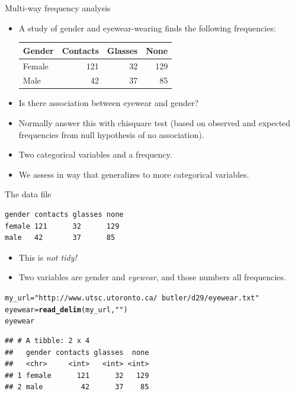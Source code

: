 \documentclass[unknownkeysallowed]{beamer}\usepackage[]{graphicx}\usepackage[]{color}
\makeatletter
\newcommand{\hlstr}[1]{\textcolor[rgb]{0.192,0.494,0.8}{#1}}%
\newcommand{\hlstd}[1]{\textcolor[rgb]{0.345,0.345,0.345}{#1}}%
\newcommand{\hlkwb}[1]{\textcolor[rgb]{0.69,0.353,0.396}{#1}}%
\newcommand{\hlkwd}[1]{\textcolor[rgb]{0.737,0.353,0.396}{\textbf{#1}}}%
\newenvironment{kframe}{%
 \def\at@end@of@kframe{}%
 \ifinner\ifhmode%
  \def\at@end@of@kframe{\end{minipage}}%
  \begin{minipage}{\columnwidth}%
 \fi\fi%
 \def\FrameCommand##1{\hskip\@totalleftmargin \hskip-\fboxsep
 \colorbox{shadecolor}{##1}\hskip-\fboxsep
     \hskip-\linewidth \hskip-\@totalleftmargin \hskip\columnwidth}%
 \MakeFramed {\advance\hsize-\width
   \@totalleftmargin\z@ \linewidth\hsize
   \@setminipage}}%
 {\par\unskip\endMakeFramed%
 \at@end@of@kframe}
\newenvironment{knitrout}{}{} %
\makeatother
\begin{document}
\begin{frame}[fragile]{Multi-way frequency analysis}

  \begin{itemize}
  \item A study of gender and eyewear-wearing finds the following frequencies:

    \begin{tabular}{lrrr}
      \hline
      Gender & Contacts & Glasses & None \\
      \hline
      Female & 121 & 32 & 129 \\
      Male & 42 & 37 & 85\\
      \hline
    \end{tabular}


  \item Is there association between eyewear and gender?
  \item Normally answer this with chisquare test (based on observed and expected frequencies from null hypothesis of no association).
  \item Two categorical variables and a frequency.
  \item We assess in way that generalizes to more categorical variables.

  \end{itemize}

\end{frame}

\begin{frame}[fragile]{The data file}
  
\begin{verbatim}
gender contacts glasses none
female 121      32      129
male   42       37      85
\end{verbatim}
  
  \begin{itemize}
  \item This is \emph{not tidy!}
  \item Two variables are gender and \emph{eyewear}, and those numbers
    all frequencies.
  \end{itemize}

\begin{knitrout}
\color{fgcolor}\begin{kframe}
\begin{alltt}
\hlstd{my_url}\hlkwb{=}\hlstr{"http://www.utsc.utoronto.ca/~butler/d29/eyewear.txt"}
\hlstd{eyewear}\hlkwb{=}\hlkwd{read_delim}\hlstd{(my_url,}\hlstr{" "}\hlstd{)}
\hlstd{eyewear}
\end{alltt}
\begin{verbatim}
## # A tibble: 2 x 4
##   gender contacts glasses  none
##   <chr>     <int>   <int> <int>
## 1 female      121      32   129
## 2 male         42      37    85
\end{verbatim}
\end{kframe}
\end{knitrout}
  
\end{frame}
\end{document}
